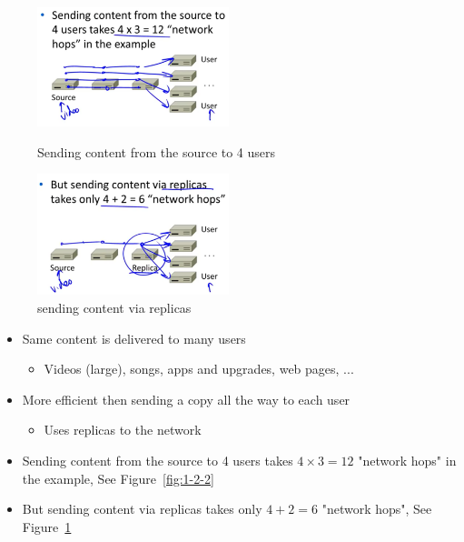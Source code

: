 \documentclass[12pt]{ctexart}   %
\begin{document}
	
		\begin{figure}
			\begin{minipage}[t]{0.5\linewidth}
				\centering
				\includegraphics[width=2.2in]{images/1-2-2}
				\caption{Sending content from the source to 4 users}
				\label{fig:1-2-2}
			\end{minipage}
			\begin{minipage}[t]{0.5\linewidth}
				\centering
				\includegraphics[width=2.2in]{images/1-2-3}
				\caption{sending content via replicas}
				\label{fig:1-2-3}
			\end{minipage}
		\end{figure}
	
	
	\begin{itemize}
		\item Same content is delivered to many users
		\begin{itemize}
			\item Videos (large), songs, apps and upgrades, web pages, ...
		\end{itemize}
		
		\item More efficient then sending a copy all the way to each user
		\begin{itemize}
			\item Uses replicas to the network
		\end{itemize}
		
		\item Sending content from the source to 4 users takes \underline{$4 \times 3=12$} "network hops" in the example, See Figure~\ref{fig:1-2-2}
		\item But sending content via replicas takes only \underline{$4+2=6$} "network hops", See Figure~\ref{fig:1-2-3}
	\end{itemize}
	
\end{document}
